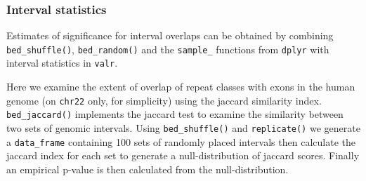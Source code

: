 \begin{Shaded}
\begin{Highlighting}[]

\StringTok{ } \StringTok{ }\NormalTok{)}
\StringTok{ }\NormalTok{(}\NormalTok{, }\NormalTok{, } \NormalTok{)}

\StringTok{ }\NormalTok{(} \StringTok{ } \StringTok{ }

\StringTok{ }\NormalTok{(}  
\StringTok{  }\NormalTok{(} \NormalTok{) +}\StringTok{ } \NormalTok{) +}\StringTok{ }
\StringTok{  }\NormalTok{(}  \StringTok{ }
\StringTok{  }\NormalTok{(}\NormalTok{) +}\StringTok{ }\NormalTok{(}\NormalTok{) +}\StringTok{ }
\StringTok{  }\NormalTok{()}
\end{Highlighting}
\end{Shaded}

\subsubsection{Interval statistics}\label{interval-statistics}

Estimates of significance for interval overlaps can be obtained by
combining \texttt{bed\_shuffle()}, \texttt{bed\_random()} and the
\texttt{sample\_} functions from \texttt{dplyr} with interval statistics
in \texttt{valr}.

Here we examine the extent of overlap of repeat classes with exons in
the human genome (on \texttt{chr22} only, for simplicity) using the
jaccard similarity index. \texttt{bed\_jaccard()} implements the jaccard
test to examine the similarity between two sets of genomic intervals.
Using \texttt{bed\_shuffle()} and \texttt{replicate()} we generate a
\texttt{data\_frame} containing 100 sets of randomly placed intervals
then calculate the jaccard index for each set to generate a
null-distribution of jaccard scores. Finally an empirical p-value is
then calculated from the null-distribution.

